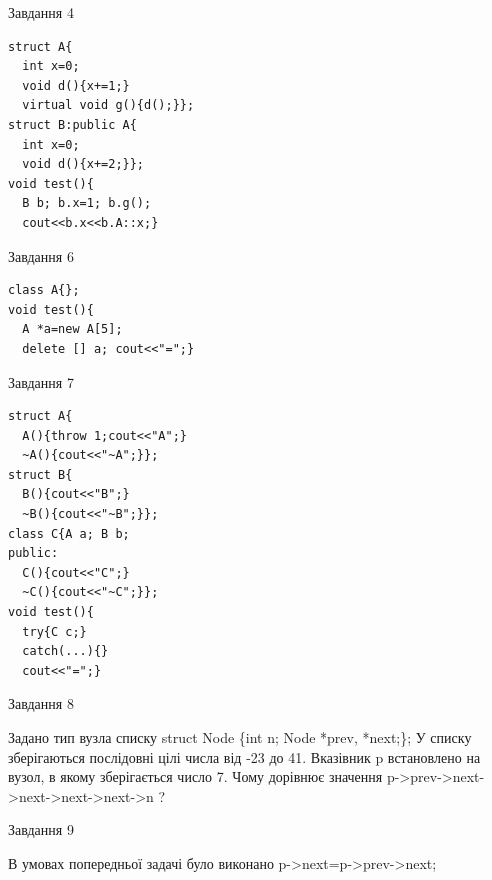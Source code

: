 \documentclass[12pt, ukrainian]{article}
\begin{document}
{{{{{{{{{{\begin{minipage}[t]{7cm}
{\begin{center}Завдання {4}\end{center}}
\vspace{-6mm}

\begin{verbatim}
struct A{
  int x=0;
  void d(){x+=1;}
  virtual void g(){d();}};
struct B:public A{
  int x=0;
  void d(){x+=2;}};
void test(){
  B b; b.x=1; b.g();
  cout<<b.x<<b.A::x;}
\end{verbatim}            


               
{\begin{center}Завдання {6}\end{center}}
\vspace{-6mm}

\begin{verbatim}
class A{};
void test(){
  A *a=new A[5]; 
  delete [] a; cout<<"=";}
\end{verbatim}            


               
{\begin{center}Завдання {7}\end{center}}
\vspace{-6mm}

\begin{verbatim}
struct A{
  A(){throw 1;cout<<"A";}
  ~A(){cout<<"~A";}};
struct B{
  B(){cout<<"B";}
  ~B(){cout<<"~B";}};
class C{A a; B b;
public:
  C(){cout<<"C";}
  ~C(){cout<<"~C";}};
void test(){
  try{C c;} 
  catch(...){} 
  cout<<"=";}
\end{verbatim}            


\end{minipage}
               
{\begin{center}Завдання {8}\end{center}}
\vspace{-6mm}
Задано тип вузла списку
struct Node \{int n; Node *prev, *next;\};
У списку зберігаються послідовні цілі числа від -23 до 41. Вказівник p встановлено на вузол, в якому зберігається число 7.
Чому дорівнює значення p->prev->next->next->next->next->n ?\par

               
{\begin{center}Завдання {9}\end{center}}
\vspace{-6mm}
В умовах попередньої задачі було виконано p->next=p->prev->next;

}}}}}}}}}}
\end{document}
